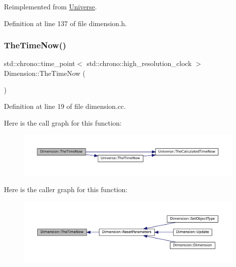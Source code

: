 Reimplemented from \mbox{\hyperlink{class_universe_a2d3d642bfdc863248e93535832fa4b00}{Universe}}.



Definition at line 137 of file dimension.\+h.

\mbox{\label{class_dimension_ab39b7ff253ade59c5c2d807c511b4028}} 
\subsubsection{\texorpdfstring{The\+Time\+Now()}{TheTimeNow()}}
{\footnotesize\ttfamily std\+::chrono\+::time\+\_\+point$<$ std\+::chrono\+::high\+\_\+resolution\+\_\+clock $>$ Dimension\+::\+The\+Time\+Now (\begin{DoxyParamCaption}{ }\end{DoxyParamCaption})}



Definition at line 19 of file dimension.\+cc.

Here is the call graph for this function\+:\nopagebreak
\begin{figure}[H]
\begin{center}
\leavevmode
\includegraphics[width=350pt]{class_dimension_ab39b7ff253ade59c5c2d807c511b4028_cgraph}
\end{center}
\end{figure}
Here is the caller graph for this function\+:\nopagebreak
\begin{figure}[H]
\begin{center}
\leavevmode
\includegraphics[width=350pt]{class_dimension_ab39b7ff253ade59c5c2d807c511b4028_icgraph}
\end{center}
\end{figure}
\mbox{\label{class_dimension_a663916c2573b6df4db02ccee5678a75d}} 

